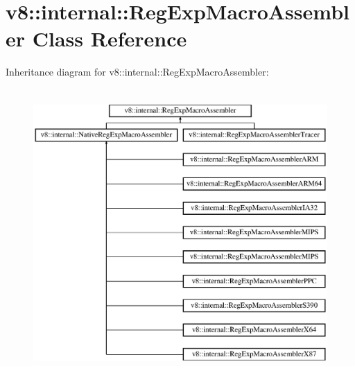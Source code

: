 \hypertarget{classv8_1_1internal_1_1_reg_exp_macro_assembler}{}\section{v8\+:\+:internal\+:\+:Reg\+Exp\+Macro\+Assembler Class Reference}
\label{classv8_1_1internal_1_1_reg_exp_macro_assembler}
Inheritance diagram for v8\+:\+:internal\+:\+:Reg\+Exp\+Macro\+Assembler\+:\begin{figure}[H]
\begin{center}
\leavevmode
\includegraphics[height=11.000000cm]{classv8_1_1internal_1_1_reg_exp_macro_assembler}
\end{center}
\end{figure}
